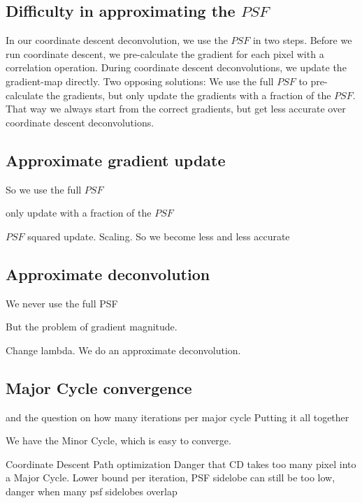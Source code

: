 \subsection{Difficulty in approximating the $PSF$}

In our coordinate descent deconvolution, we use the $PSF$ in two steps. Before we run coordinate descent, we pre-calculate the gradient for each pixel with a correlation operation. During coordinate descent deconvolutions, we update the gradient-map directly. Two opposing solutions: We use the full $PSF$ to pre-calculate the gradients, but only update the gradients with a fraction of the $PSF$. That way we always start from the correct gradients, but get less accurate over coordinate descent deconvolutions.

\subsection{Approximate gradient update}

So we use the full $PSF$

only update with a fraction of the $PSF$

$PSF$ squared update. Scaling.
So we become less and less accurate


\subsection{Approximate deconvolution}

We never use the full PSF

But the problem of gradient magnitude. 

Change lambda. We do an approximate deconvolution. 


\subsection{Major Cycle convergence}
\cite{clark1980efficient} and the question on how many iterations per major cycle
Putting it all together

We have the Minor Cycle, which is easy to converge.

Coordinate Descent Path optimization \cite{friedman2010regularization}
Danger that CD takes too many pixel into a Major Cycle. Lower bound per iteration, PSF sidelobe
can still be too low, danger when many psf sidelobes overlap